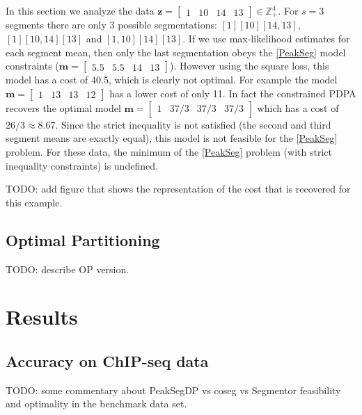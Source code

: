 \documentclass{article}
\newcommand{\ZZ}{\mathbb Z}
\begin{document}
In this section we analyze the data
$\mathbf z = \left[\begin{array}{cccc} 1 & 10 & 14 & 13
\end{array}\right]\in\ZZ_+^4
$. For $s=3$ segments there are only 3 possible segmentations:
$[1][10][14, 13]$, $[1][10, 14][13]$ and $[1, 10][14][13]$. If we use
max-likelihood estimates for each segment mean, then only the last
segmentation obeys the \ref{PeakSeg} model constraints
($\mathbf m =\left[\begin{array}{cccc} 5.5 & 5.5 & 14 &
    13\end{array}\right]$). However using the square loss, this model
has a cost of 40.5, which is clearly not optimal. For example the
model
$\mathbf m =\left[\begin{array}{cccc} 1 & 13 & 13 &
    12\end{array}\right]$ has a lower cost of only 11. In fact the
constrained PDPA recovers the optimal model
$\mathbf m =\left[\begin{array}{cccc} 1 & 37/3 & 37/3 &
    37/3\end{array}\right]$ which has a cost of $26/3\approx
8.67$. Since the strict inequality is not satisfied (the second and
third segment means are exactly equal), this model is not feasible for
the \ref{PeakSeg} problem. For these data, the minimum of the
\ref{PeakSeg} problem (with strict inequality constraints) is
undefined.

TODO: add figure that shows the representation of the cost that is
recovered for this example.

\subsection{Optimal Partitioning}

TODO: describe OP version.



\section{Results}

\subsection{Accuracy on ChIP-seq data}

TODO: some commentary about PeakSegDP vs coseg vs Segmentor
feasibility and optimality in the benchmark data set.
\end{document}
